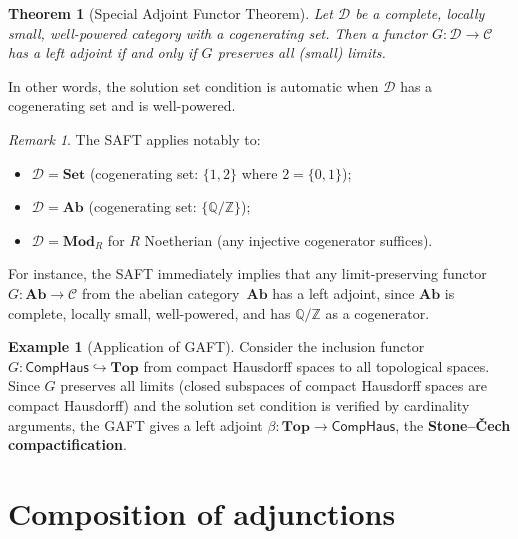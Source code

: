 \documentclass[a4paper,12pt]{book}
\newcommand{\Set}{\mathbf{Set}}
\newcommand{\Ab}{\mathbf{Ab}}
\newcommand{\Top}{\mathbf{Top}}
\newcommand{\Mod}{\mathbf{Mod}}
\newcommand{\Z}{\mathbb{Z}}
\newcommand{\Q}{\mathbb{Q}}
\theoremstyle{definition}
\newtheorem{example}[definition]{Example}
\theoremstyle{plain}
\newtheorem{theorem}[definition]{Theorem}
\theoremstyle{remark}
\newtheorem{remark}[definition]{Remark}
\begin{document}
\begin{theorem}[Special Adjoint Functor Theorem]%
\label{thm:SAFT}
Let $\mathcal{D}$ be a complete, locally small, well-powered
category with a cogenerating set.
Then a functor $G\colon\mathcal{D}\to\mathcal{C}$ has a left
adjoint if and only if $G$ preserves all (small) limits.
\end{theorem}

In other words, the solution set condition is automatic when $\mathcal{D}$
has a cogenerating set and is well-powered.

\begin{remark}\label{rem:SAFT-applications}
The SAFT applies notably to:
\begin{itemize}
\item $\mathcal{D} = \Set$ (cogenerating set: $\{1, 2\}$ where
      $2 = \{0,1\}$);
\item $\mathcal{D} = \Ab$ (cogenerating set: $\{\Q/\Z\}$);
\item $\mathcal{D} = \Mod_R$ for $R$ Noetherian
      (any injective cogenerator suffices).
\end{itemize}
For instance, the SAFT immediately implies that any limit-preserving
functor $G\colon\Ab\to\mathcal{C}$ from the abelian category~$\Ab$
has a left adjoint, since $\Ab$ is complete, locally small,
well-powered, and has $\Q/\Z$ as a cogenerator.
\end{remark}

\begin{example}[Application of GAFT]\label{ex:GAFT-application}
Consider the inclusion functor $G\colon\mathsf{CompHaus}\hookrightarrow\Top$
from compact Hausdorff spaces to all topological spaces.
Since $G$ preserves all limits (closed subspaces of compact Hausdorff
spaces are compact Hausdorff) and the solution set condition is verified
by cardinality arguments, the GAFT gives a left adjoint
$\beta\colon\Top\to\mathsf{CompHaus}$, the
\textbf{Stone--\v{C}ech compactification}.
\end{example}


\section{Composition of adjunctions}\label{sec:adj-composition}
\end{document}

